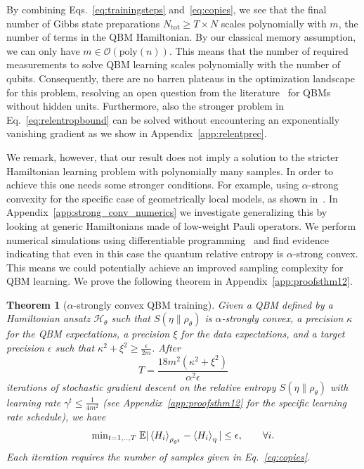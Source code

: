 \documentclass[
    aps,
    prx,
    floatfix,
    nofootinbib,
    onecolumn
]{revtex4-2}
\newtheorem{theorem}{Theorem}
\begin{document}
By combining Eqs.~\eqref{eq:trainingsteps} and~\eqref{eq:copies}, we see that the final number of Gibbs state preparations $N_{\mathrm{tot}}\geq T\times N$ scales polynomially with $m$, the number of terms in the QBM Hamiltonian. By our classical memory assumption, we can only have $m \in \mathcal{O}(\text{poly}(n))$. This means that the number of required measurements to solve QBM learning scales polynomially with the number of qubits. Consequently, there are no barren plateaus in the optimization landscape for this problem, resolving an open question from the literature~\cite{Anschuetz_2022, Kieferova_2021} for QBMs without hidden units. Furthermore, also the stronger problem in Eq.~\eqref{eq:relentropbound} can be solved without encountering an exponentially vanishing gradient as we show in Appendix~\ref{app:relentprec}.

We remark, however, that our result does not imply a solution to the stricter Hamiltonian learning problem with polynomially many samples. In order to achieve this one needs some stronger conditions. For example, using $\alpha$-strong convexity for the specific case of geometrically local models, as shown in~\cite{Anshu_2021}. In Appendix~\ref{app:strong_conv_numerics} we investigate generalizing this by looking at generic Hamiltonians made of low-weight Pauli operators. We perform numerical simulations using differentiable programming~\cite{Baydin2017} and find evidence indicating that even in this case the quantum relative entropy is $\alpha$-strong convex. This means we could potentially achieve an improved sampling complexity for QBM learning. We prove the following theorem in Appendix~\ref{app:proofsthm12}. 

\begin{theorem}[$\alpha$-strongly convex QBM training]
\label{thm:training_alpha}
Given a QBM defined by a Hamiltonian ansatz $\mathcal{H}_\theta$ such that $S(\eta\|\rho_\theta)$ is $\alpha$-strongly convex, a precision $\kappa$ for the QBM expectations, a precision $\xi$ for the data expectations, and a target precision $\epsilon$ such that $\kappa^2 + \xi^2 \geq \frac{\epsilon}{2m}$. After
\begin{equation}
T =\frac{18 m^2 (\kappa^2 + \xi^2)}{\alpha^2\epsilon}
\end{equation} 
iterations of stochastic gradient descent on the relative entropy $S(\eta \|\rho_\theta)$ with learning rate $\gamma^t \leq \frac{1}{4m^2}$ (see Appendix~\ref{app:proofsthm12} for the specific learning rate schedule), we have
\begin{equation}
    \mathrm{min}_{t=1,..,T} \; \mathbb{E}| \expval{H_i}_{\rho_{\theta^t}}  - \expval{H_i}_\eta | \leq \epsilon, \qquad \forall i.
\end{equation} 
Each iteration requires the number of samples given in Eq.~\eqref{eq:copies}. 
\end{theorem} 
\end{document}
